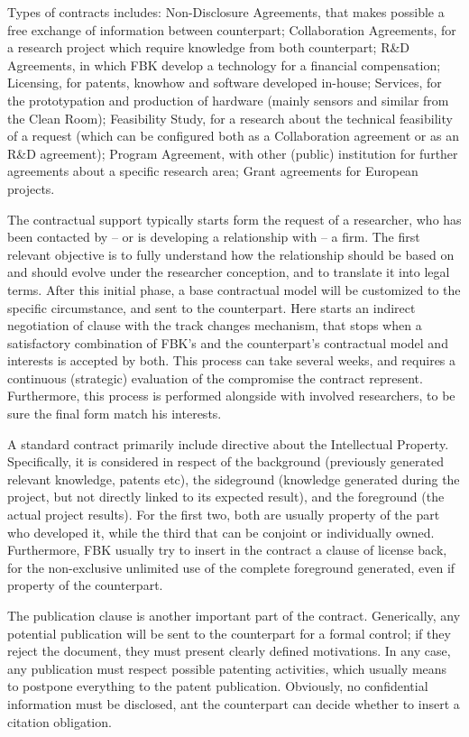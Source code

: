 Types of contracts includes: Non-Disclosure Agreements, that makes possible a free exchange of information between counterpart; Collaboration Agreements, for a research project which require knowledge from both counterpart; R\&D Agreements, in which FBK develop a technology for a financial compensation; Licensing, for patents, knowhow and software developed in-house; Services, for the prototypation and production of hardware (mainly sensors and similar from the Clean Room); Feasibility Study, for a research about the technical feasibility of a request (which can be configured both as a Collaboration agreement or as an R\&D agreement); Program Agreement, with other (public) institution for further agreements about a specific research area; Grant agreements for European projects. 

The contractual support typically starts form the request of a researcher, who has been contacted by – or is developing a relationship with – a firm. The first relevant objective is to fully understand how the relationship should be based on and should evolve under the researcher conception, and to translate it into legal terms. After this initial phase, a base contractual model will be customized to the specific circumstance, and sent to the counterpart. Here starts an indirect negotiation of clause with the track changes mechanism, that stops when a satisfactory combination of FBK’s and the counterpart’s contractual model and interests is accepted by both. This process can take several weeks, and requires a continuous (strategic) evaluation of the compromise the contract represent. Furthermore, this process is performed alongside with involved researchers, to be sure the final form match his interests.

A standard contract primarily include directive about the Intellectual Property. Specifically, it is considered in respect of the background (previously generated relevant knowledge, patents etc), the sideground (knowledge generated during the project, but not directly linked to its expected result), and the foreground (the actual project results). For the first two, both are usually property of the part who developed it, while the third that can be conjoint or individually owned. Furthermore, FBK usually try to insert in the contract a clause of license back, for the non-exclusive unlimited use of the complete foreground generated, even if property of the counterpart.

The publication clause is another important part of the contract. Generically, any potential publication will be sent to the counterpart for a formal control; if they reject the document, they must present clearly defined motivations. In any case, any publication must respect possible patenting activities, which usually means to postpone everything to the patent publication. Obviously, no confidential information must be disclosed, ant the counterpart can decide whether to insert a citation obligation. 


